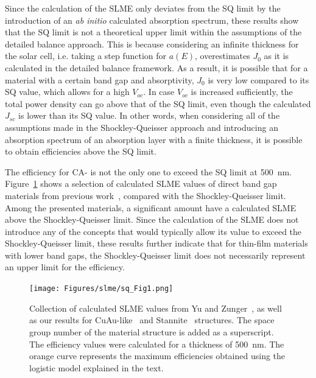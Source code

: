 \begin{refsection}
Since the calculation of the SLME only deviates from the SQ limit by the 
introduction of an \textit{ab initio} calculated absorption spectrum, these 
results show that the SQ limit is not a theoretical upper limit within the 
assumptions of the detailed balance approach. This is because considering an 
infinite thickness for the solar cell, i.e. taking a step function for $a(E)$, 
overestimates $J_0$ as it is calculated in the detailed balance framework. As 
a result, it is possible that for a material with a certain band gap and 
absorptivity, $J_0$ is very low compared to its SQ value, which allows for a 
high $V_{oc}$. In case $V_{oc}$ is increased sufficiently, the total power 
density can go above that of the SQ limit, even though the calculated $J_{sc}$ 
is lower than its SQ value. In other words, when considering all of the 
assumptions made in the Shockley-Queisser approach and introducing an absorption 
spectrum of an absorption layer with a finite thickness, it is possible to 
obtain efficiencies above the SQ limit. 
 
 
The efficiency for CA- is not the only one to exceed the SQ limit at 500~\si{\nano\meter}. 
Figure~\ref{slme:fig-logistic} shows a selection of calculated SLME values of 
direct band gap materials from previous work~\cite{Yu2012, Bercx2016, 
Sarmadian2016}, compared with the Shockley-Queisser limit. Among the presented 
materials, a significant amount have a calculated SLME 
above the Shockley-Queisser limit. Since the calculation of the SLME does not 
introduce any of the concepts that would typically allow its value to exceed 
the Shockley-Queisser limit, these results further indicate that for thin-film 
materials with lower band gaps, the Shockley-Queisser limit does not 
necessarily represent an upper limit for the efficiency. 
 
\begin{figure}[ht] 
\captionsetup{width=0.9\textwidth}
\centering 
\texttt{[image: Figures/slme/sq\_Fig1.png]} 
\caption{Collection of calculated SLME values from Yu and 
Zunger~\cite{Yu2012}, as well as our results for CuAu-like~\cite{Bercx2016} 
and Stannite~\cite{Sarmadian2016} structures. The space group number of 
the material structure is added as a superscript. The efficiency values were calculated 
for a thickness of 500~\si{\nano\meter}. The orange curve represents the 
maximum efficiencies obtained using the logistic model explained in the text.} 
\label{slme:fig-logistic} 
\end{figure} 
 

\end{refsection}
